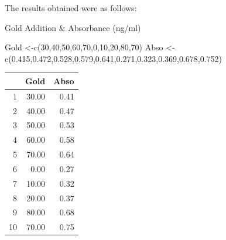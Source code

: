 \documentclass[a4paper,12pt]{article}
\begin{document}
The results obtained were as follows:

Gold Addition   & Absorbance
(ng/ml)

Gold <-c(30,40,50,60,70,0,10,20,80,70)
Abso <-c(0.415,0.472,0.528,0.579,0.641,0.271,0.323,0.369,0.678,0.752)

\begin{table}[ht]
	\centering
	\begin{tabular}{rrr}
		\hline
		& Gold & Abso \\ 
		\hline
		1 & 30.00 & 0.41 \\ 
		2 & 40.00 & 0.47 \\ 
		3 & 50.00 & 0.53 \\ 
		4 & 60.00 & 0.58 \\ 
		5 & 70.00 & 0.64 \\ 
		6 & 0.00 & 0.27 \\ 
		7 & 10.00 & 0.32 \\ 
		8 & 20.00 & 0.37 \\ 
		9 & 80.00 & 0.68 \\ 
		10 & 70.00 & 0.75 \\ 
		\hline
	\end{tabular}
\end{table}
\end{document}
